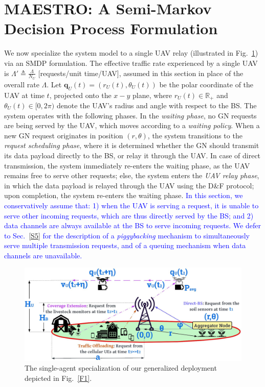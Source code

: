 \documentclass[12pt, draftcls, onecolumn]{IEEEtran}
\theoremstyle{plain}
\theoremstyle{definition}
\theoremstyle{remark}
\newcommand\hlt[1]{\textcolor{blue}{#1}}
\begin{document}
\section{MAESTRO: A Semi-Markov Decision Process Formulation}\label{S3}
We now specialize the system model to a single UAV relay (illustrated in Fig.~\ref{F4}) via an SMDP formulation. The effective traffic rate experienced by a single UAV is $\Lambda'{\triangleq}\frac{\Lambda}{N_{U}}$ [requests/unit time/UAV], assumed in this section in place of the overall rate $\Lambda$. Let $\mathbf{q}_{U}(t){=}(r_{U}(t),\theta_{U}(t))$ be the polar coordinate of the UAV at time $t$, projected onto the $x{-}y$ plane, where $r_{U}(t){\in}\mathbb{R}_{+}$ and $\theta_{U}(t){\in}[0,2\pi)$ denote the UAV's radius and angle with respect to the BS. The system operates with the following phases. In the \emph{waiting phase}, no GN requests are being served by the UAV, which moves according to a \emph{waiting policy}. When a new GN request originates in position $(r,\theta)$, the system transitions to the \emph{request scheduling phase}, where it is determined whether the GN should transmit its data payload directly to the BS, or relay it through the UAV. In case of direct transmission, the system immediately re-enters the waiting phase, as the UAV remains free to serve other requests; else, the system enters the \emph{UAV relay phase}, in which the data payload is relayed through the UAV using the D\&F protocol; upon  completion, the system re-enters the waiting phase. \hlt{In this section, we conservatively assume that: 1) when the UAV is serving a request, it is unable to serve other incoming requests, which are thus directly served by the BS; and 2) data channels are always available at the BS to serve incoming requests. We defer to Sec.~\ref{S5} for the description of a \emph{piggybacking} mechanism to simultaneously serve multiple transmission requests, and of a queuing mechanism when data channels are unavailable.}
\begin{figure} [t]
    \centering
    \includegraphics[width=0.7\linewidth]{figs/Deployment_Model_Specialization.jpg}
    \vspace{-2mm}
    \caption{The single-agent specialization of our generalized deployment depicted in Fig.~\ref{F1}.}
    \label{F4}
\end{figure}
\end{document}
